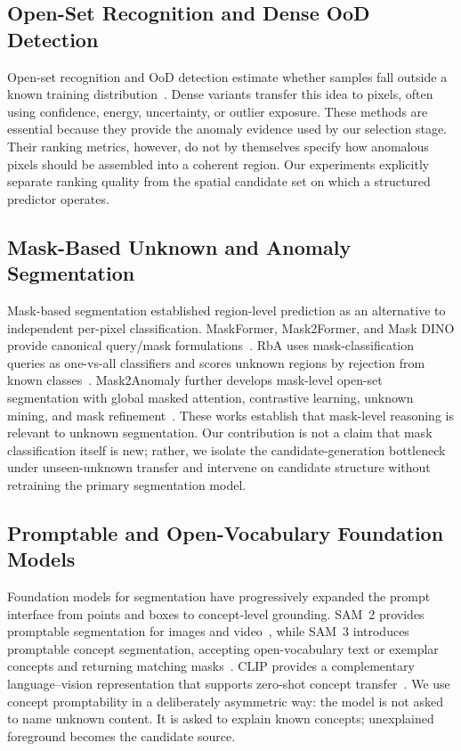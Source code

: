 \documentclass[journal]{IEEEtai}
\begin{document}
\subsection{Open-Set Recognition and Dense OoD Detection}
Open-set recognition and OoD detection estimate whether samples fall outside a known training distribution~\cite{hendrycks2017baselinedetecting,liu2020energyout,bendale2016towardsopen,zhou2021learningplaceholders,yang2024generalizedout}. Dense variants transfer this idea to pixels, often using confidence, energy, uncertainty, or outlier exposure. These methods are essential because they provide the anomaly evidence used by our selection stage. Their ranking metrics, however, do not by themselves specify how anomalous pixels should be assembled into a coherent region. Our experiments explicitly separate ranking quality from the spatial candidate set on which a structured predictor operates.

\subsection{Mask-Based Unknown and Anomaly Segmentation}
Mask-based segmentation established region-level prediction as an alternative to independent per-pixel classification. MaskFormer, Mask2Former, and Mask DINO provide canonical query/mask formulations~\cite{cheng2021perpixel,cheng2022mask2former,li2022maskdino}. RbA uses mask-classification queries as one-vs-all classifiers and scores unknown regions by rejection from known classes~\cite{nayal2023rba}. Mask2Anomaly further develops mask-level open-set segmentation with global masked attention, contrastive learning, unknown mining, and mask refinement~\cite{rai2024mask2anomaly}. These works establish that mask-level reasoning is relevant to unknown segmentation. Our contribution is not a claim that mask classification itself is new; rather, we isolate the candidate-generation bottleneck under unseen-unknown transfer and intervene on candidate structure without retraining the primary segmentation model.

\subsection{Promptable and Open-Vocabulary Foundation Models}
Foundation models for segmentation have progressively expanded the prompt interface from points and boxes to concept-level grounding. SAM~2 provides promptable segmentation for images and video~\cite{ravi2024sam2}, while SAM~3 introduces promptable concept segmentation, accepting open-vocabulary text or exemplar concepts and returning matching masks~\cite{carion2025sam3}. CLIP provides a complementary language--vision representation that supports zero-shot concept transfer~\cite{radford2021clip}. We use concept promptability in a deliberately asymmetric way: the model is not asked to name unknown content. It is asked to explain known concepts; unexplained foreground becomes the candidate source.
\end{document}
